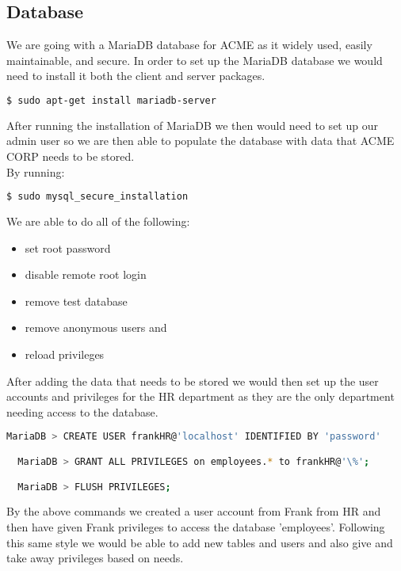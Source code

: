 
\subsection{Database}
We are going with a MariaDB database for ACME as it widely used, easily 
maintainable, and secure. In order to set up the MariaDB database we would
need to install it both the client and server packages.

\begin{lstlisting}[language=bash] 
  $ sudo apt-get install mariadb-server
\end{lstlisting}

\noindent After running the installation of MariaDB we then would need to set 
up our admin user so we are then able to populate the database with data that 
ACME CORP needs to be stored. \\

\noindent By running:

\begin{lstlisting}[language=bash] 
  $ sudo mysql_secure_installation
\end{lstlisting}

\vspace{.5em}

\noindent We are able to do all of the following: 

\begin{itemize}
\item set root password
\item disable remote root login
\item remove test database
\item remove anonymous users and
\item reload privileges
\end{itemize}

\noindent After adding the data that needs to be stored we would then set up 
the user accounts and privileges for the HR department as they are the only 
department needing access to the database.

\begin{lstlisting}[language=bash]
  MariaDB > CREATE USER frankHR@'localhost' IDENTIFIED BY 'password'

  MariaDB > GRANT ALL PRIVILEGES on employees.* to frankHR@'\%';

  MariaDB > FLUSH PRIVILEGES; 
\end{lstlisting}

\vspace{.5em}

\noindent By the above commands we created a user account from Frank from HR 
and then have given Frank privileges to access the database 'employees'. 
Following this same style we would be able to add new tables and users and also
 give and take away privileges based on needs.


